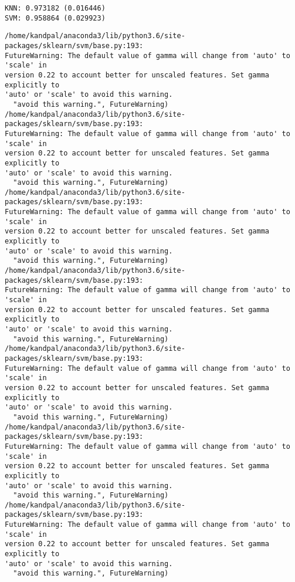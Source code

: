 \documentclass[11pt]{article}
\begin{document}
    \begin{Verbatim}[commandchars=\\\{\}]
KNN: 0.973182 (0.016446)
SVM: 0.958864 (0.029923)
    \end{Verbatim}

    \begin{Verbatim}[commandchars=\\\{\}]
/home/kandpal/anaconda3/lib/python3.6/site-packages/sklearn/svm/base.py:193:
FutureWarning: The default value of gamma will change from 'auto' to 'scale' in
version 0.22 to account better for unscaled features. Set gamma explicitly to
'auto' or 'scale' to avoid this warning.
  "avoid this warning.", FutureWarning)
/home/kandpal/anaconda3/lib/python3.6/site-packages/sklearn/svm/base.py:193:
FutureWarning: The default value of gamma will change from 'auto' to 'scale' in
version 0.22 to account better for unscaled features. Set gamma explicitly to
'auto' or 'scale' to avoid this warning.
  "avoid this warning.", FutureWarning)
/home/kandpal/anaconda3/lib/python3.6/site-packages/sklearn/svm/base.py:193:
FutureWarning: The default value of gamma will change from 'auto' to 'scale' in
version 0.22 to account better for unscaled features. Set gamma explicitly to
'auto' or 'scale' to avoid this warning.
  "avoid this warning.", FutureWarning)
/home/kandpal/anaconda3/lib/python3.6/site-packages/sklearn/svm/base.py:193:
FutureWarning: The default value of gamma will change from 'auto' to 'scale' in
version 0.22 to account better for unscaled features. Set gamma explicitly to
'auto' or 'scale' to avoid this warning.
  "avoid this warning.", FutureWarning)
/home/kandpal/anaconda3/lib/python3.6/site-packages/sklearn/svm/base.py:193:
FutureWarning: The default value of gamma will change from 'auto' to 'scale' in
version 0.22 to account better for unscaled features. Set gamma explicitly to
'auto' or 'scale' to avoid this warning.
  "avoid this warning.", FutureWarning)
/home/kandpal/anaconda3/lib/python3.6/site-packages/sklearn/svm/base.py:193:
FutureWarning: The default value of gamma will change from 'auto' to 'scale' in
version 0.22 to account better for unscaled features. Set gamma explicitly to
'auto' or 'scale' to avoid this warning.
  "avoid this warning.", FutureWarning)
/home/kandpal/anaconda3/lib/python3.6/site-packages/sklearn/svm/base.py:193:
FutureWarning: The default value of gamma will change from 'auto' to 'scale' in
version 0.22 to account better for unscaled features. Set gamma explicitly to
'auto' or 'scale' to avoid this warning.
  "avoid this warning.", FutureWarning)

\end{Verbatim}
\end{document}
